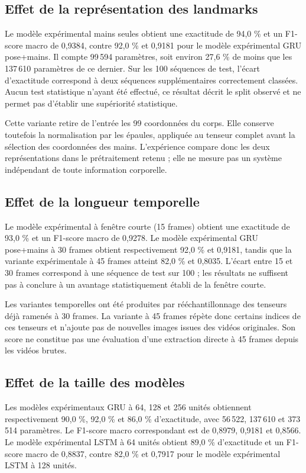 \subsection{Effet de la représentation des landmarks}

Le modèle expérimental mains seules obtient une exactitude de 94,0 \% et un F1-score macro de 0,9384, contre 92,0 \% et 0,9181 pour le modèle expérimental GRU pose+mains. Il compte 99\,594 paramètres, soit environ 27,6 \% de moins que les 137\,610 paramètres de ce dernier. Sur les 100 séquences de test, l'écart d'exactitude correspond à deux séquences supplémentaires correctement classées. Aucun test statistique n'ayant été effectué, ce résultat décrit le split observé et ne permet pas d'établir une supériorité statistique.

Cette variante retire de l'entrée les 99 coordonnées du corps. Elle conserve toutefois la normalisation par les épaules, appliquée au tenseur complet avant la sélection des coordonnées des mains. L'expérience compare donc les deux représentations dans le prétraitement retenu ; elle ne mesure pas un système indépendant de toute information corporelle.

\subsection{Effet de la longueur temporelle}

Le modèle expérimental à fenêtre courte (15 frames) obtient une exactitude de 93,0 \% et un F1-score macro de 0,9278. Le modèle expérimental GRU pose+mains à 30 frames obtient respectivement 92,0 \% et 0,9181, tandis que la variante expérimentale à 45 frames atteint 82,0 \% et 0,8035. L'écart entre 15 et 30 frames correspond à une séquence de test sur 100 ; les résultats ne suffisent pas à conclure à un avantage statistiquement établi de la fenêtre courte.

Les variantes temporelles ont été produites par rééchantillonnage des tenseurs déjà ramenés à 30 frames. La variante à 45 frames répète donc certains indices de ces tenseurs et n'ajoute pas de nouvelles images issues des vidéos originales. Son score ne constitue pas une évaluation d'une extraction directe à 45 frames depuis les vidéos brutes.

\subsection{Effet de la taille des modèles}

Les modèles expérimentaux GRU à 64, 128 et 256 unités obtiennent respectivement 90,0 \%, 92,0 \% et 86,0 \% d'exactitude, avec 56\,522, 137\,610 et 373\,514 paramètres. Le F1-score macro correspondant est de 0,8979, 0,9181 et 0,8566. Le modèle expérimental LSTM à 64 unités obtient 89,0 \% d'exactitude et un F1-score macro de 0,8837, contre 82,0 \% et 0,7917 pour le modèle expérimental LSTM à 128 unités.

